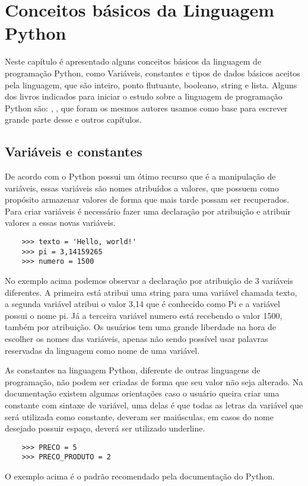 

\chapter{ Conceitos básicos da Linguagem Python}

Neste capítulo é apresentado alguns conceitos básicos da linguagem de programação Python, como Variáveis, constantes e tipos de dados básicos aceitos pela linguagem, que são inteiro, ponto flutuante, booleano, string e lista. Alguns dos livros indicados para iniciar o estudo sobre a linguagem de programação Python são:  \cite{Lutz2007}, \cite{Perkovic2016}, que foram os mesmos autores usamos como base para escrever grande parte desse e outros capítulos.

    \section{Variáveis e constantes}
	De acordo com \cite{Severance2016} o Python possui um ótimo recurso que é a manipulação de variáveis, essas variáveis são nomes atribuídos a valores, que possuem como propósito armazenar valores de forma que mais tarde possam ser recuperados. 
	Para criar variáveis é necessário fazer uma declaração por atribuição e atribuir valores a essas novas variáveis. 
	\begin{lstlisting}
	>>> texto = 'Hello, world!'
	>>> pi = 3,14159265
	>>> numero = 1500
	\end{lstlisting}
	No exemplo acima podemos observar a declaração por atribuição de 3 variáveis diferentes. A primeira está atribui uma string para uma variável chamada texto, a segunda variável atribui o valor 3,14 que é conhecido como Pi e a variável possui o nome pi. Já a terceira variável numero está recebendo o valor 1500, também por atribuição. Os usuários tem uma grande liberdade na hora de escolher os nomes das variáveis, apenas não sendo possível usar palavras reservadas da linguagem como nome de uma variável.
	
	As constantes na linguagem Python, diferente de outras linguagens de programação, não podem ser criadas de forma que seu valor não seja alterado. Na documentação existem algumas orientações caso o usuário queira criar uma constante com sintaxe de variável, uma delas é que todas as letras da variável que será utilizada como constante, deveram ser maiúsculas, em casos do nome desejado possuir espaço, deverá ser utilizado underline.
	\begin{lstlisting}
	>>> PRECO = 5
	>>> PRECO_PRODUTO = 2
	\end{lstlisting}
	O exemplo acima é o padrão recomendado pela documentação do Python.

